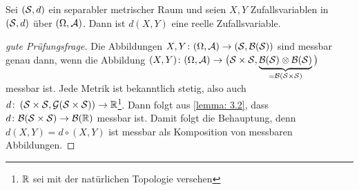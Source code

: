 \begin{satz} \label{satz: 3.5}
	Sei $(\S,d)$ ein separabler metrischer Raum und seien $X,Y$ Zufallsvariablen in $(\S,d)$ über $(\Omega,\A)$.
	Dann ist $d(X,Y)$ eine reelle Zufallsvariable.
\end{satz}

\begin{proof}[gute Prüfungsfrage]
	Die Abbildungen $X,Y \colon (\Omega,\A) \to (\S,\B(\S))$ sind messbar genau dann, wenn die Abbildung $(X,Y) \colon (\Omega,\A) \to \big( \S \times \S,\underbrace{\B(\S) \otimes \B(\S)}_{= \B(\S \times \S)}\big)$ messbar ist.
	Jede Metrik ist bekanntlich stetig, also auch $d \colon \brackets{\S \times \S , \G(\S \times \S)} \to \R$\footnote{$\R$ sei mit der natürlichen Topologie versehen}.
	Dann folgt aus \cref{lemma: 3.2}, dass $d \colon \B(\S \times \S) \to \B(\R)$	messbar ist. Damit folgt die Behauptung, denn $d(X,Y) = d \circ (X,Y)$ ist messbar als Komposition von messbaren Abbildungen.
\end{proof}

